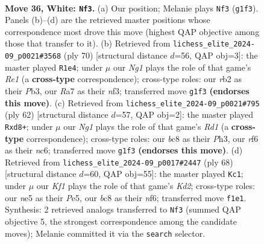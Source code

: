 \documentclass[11pt]{article}
\begin{document}
\clearpage

\begin{figure}[p]\centering
\begin{subfigure}{0.46\textwidth}\centering
\resizebox{\linewidth}{!}{%
\newchessgame
\chessboard[
  setfen={2b4k/R4p1p/5rp1/3Pn3/1p2P3/6P1/1r5P/5KNR w - - 2 36},
  showmover=false,
  pgfstyle=straightmove, color=movearrow, markmove={g1-f3}
]}
\caption{}
\end{subfigure}\hfill
\begin{subfigure}{0.46\textwidth}\centering
\resizebox{\linewidth}{!}{%
\newchessgame
\chessboard[
  setfen={2k5/8/4RNp1/pr4P1/1p1r3p/1P3n1P/P1P5/2K1R3 w - - 3 36},
  showmover=false,
  pgfstyle=straightmove, color=movearrow, markmove={e1-e4}
]}
\caption{}
\end{subfigure}
\\[4pt]
\begin{subfigure}{0.46\textwidth}\centering
\resizebox{\linewidth}{!}{%
\newchessgame
\chessboard[
  setfen={3r1k2/p4pp1/2n1r2p/2P5/PpR5/1P5P/6P1/3R2K1 w - - 0 32},
  showmover=false,
  pgfstyle=straightmove, color=movearrow, markmove={d1-d8}
]}
\caption{}
\end{subfigure}\hfill
\begin{subfigure}{0.46\textwidth}\centering
\resizebox{\linewidth}{!}{%
\newchessgame
\chessboard[
  setfen={R7/1p2kp1p/1r3np1/p3P3/5P2/1PN5/1P1K3r/3R4 w - - 3 35},
  showmover=false,
  pgfstyle=straightmove, color=movearrow, markmove={d2-c1}
]}
\caption{}
\end{subfigure}
\caption{\textbf{Move 36, White: \texttt{Nf3}.} (a) Our position; Melanie plays \texttt{Nf3} (\texttt{g1f3}). Panels (b)--(d) are the retrieved master positions whose correspondence most drove this move (highest QAP objective among those that transfer to it). (b) Retrieved from \texttt{lichess\_elite\_2024-09\_p0021\#3568} (ply 70) [structural distance $d$=56, QAP obj=3]: the master played \texttt{R1e4}; under $\mu$ our \emph{Ng1} plays the role of that game's \emph{Re1} (a \textbf{cross-type} correspondence); cross-type roles: our \emph{r}b2 as their \emph{P}b3, our \emph{R}a7 as their \emph{n}f3; transferred move \texttt{g1f3} \textbf{(endorses this move)}. (c) Retrieved from \texttt{lichess\_elite\_2024-09\_p0021\#795} (ply 62) [structural distance $d$=57, QAP obj=2]: the master played \texttt{Rxd8+}; under $\mu$ our \emph{Ng1} plays the role of that game's \emph{Rd1} (a \textbf{cross-type} correspondence); cross-type roles: our \emph{b}c8 as their \emph{P}h3, our \emph{r}f6 as their \emph{n}c6; transferred move \texttt{g1f3} \textbf{(endorses this move)}. (d) Retrieved from \texttt{lichess\_elite\_2024-09\_p0017\#2447} (ply 68) [structural distance $d$=60, QAP obj=55]: the master played \texttt{Kc1}; under $\mu$ our \emph{Kf1} plays the role of that game's \emph{Kd2}; cross-type roles: our \emph{n}e5 as their \emph{P}e5, our \emph{b}c8 as their \emph{n}f6; transferred move \texttt{f1e1}. Synthesis: 2 retrieved analogs transferred to \texttt{Nf3} (summed QAP objective 5, the strongest correspondence among the candidate moves); Melanie committed it via the \texttt{search} selector.}
\label{fig:thought-m70}
\end{figure}
\end{document}
